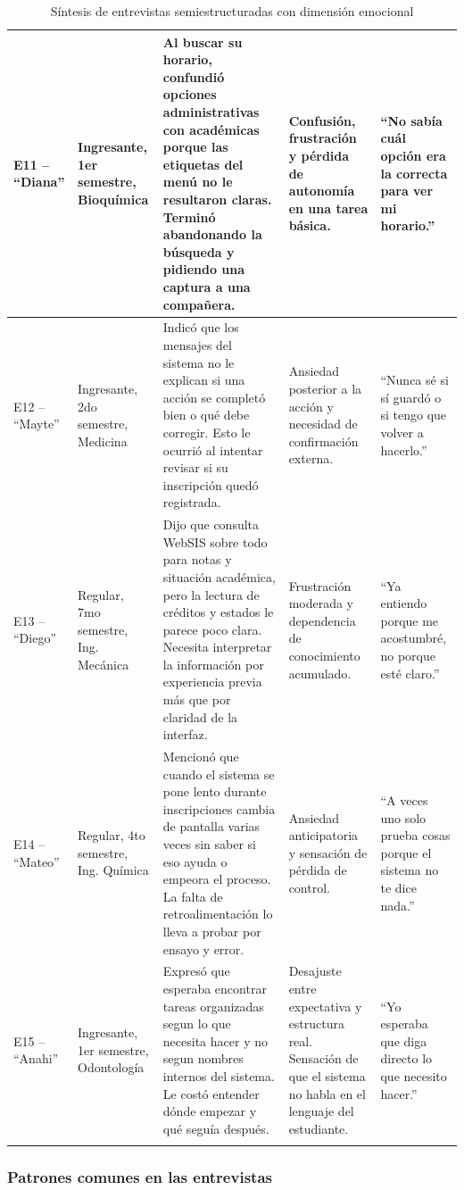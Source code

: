 \begin{longtable}{|p{1.8cm}|p{2.5cm}|p{3.2cm}|p{3.2cm}|p{2.4cm}|}
\hline
E11 -- ``Diana'' & Ingresante, 1er semestre, Bioquímica & Al buscar su horario, confundió opciones administrativas con académicas porque las etiquetas del menú no le resultaron claras. Terminó abandonando la búsqueda y pidiendo una captura a una compañera. & Confusión, frustración y pérdida de autonomía en una tarea básica. & ``No sabía cuál opción era la correcta para ver mi horario.'' \\
\hline
E12 -- ``Mayte'' & Ingresante, 2do semestre, Medicina & Indicó que los mensajes del sistema no le explican si una acción se completó bien o qué debe corregir. Esto le ocurrió al intentar revisar si su inscripción quedó registrada. & Ansiedad posterior a la acción y necesidad de confirmación externa. & ``Nunca sé si sí guardó o si tengo que volver a hacerlo.'' \\
\hline
E13 -- ``Diego'' & Regular, 7mo semestre, Ing. Mecánica & Dijo que consulta WebSIS sobre todo para notas y situación académica, pero la lectura de créditos y estados le parece poco clara. Necesita interpretar la información por experiencia previa más que por claridad de la interfaz. & Frustración moderada y dependencia de conocimiento acumulado. & ``Ya entiendo porque me acostumbré, no porque esté claro.'' \\
\hline
E14 -- ``Mateo'' & Regular, 4to semestre, Ing. Química & Mencionó que cuando el sistema se pone lento durante inscripciones cambia de pantalla varias veces sin saber si eso ayuda o empeora el proceso. La falta de retroalimentación lo lleva a probar por ensayo y error. & Ansiedad anticipatoria y sensación de pérdida de control. & ``A veces uno solo prueba cosas porque el sistema no te dice nada.'' \\
\hline
E15 -- ``Anahi'' & Ingresante, 1er semestre, Odontología & Expresó que esperaba encontrar tareas organizadas segun lo que necesita hacer y no segun nombres internos del sistema. Le costó entender dónde empezar y qué seguía después. & Desajuste entre expectativa y estructura real. Sensación de que el sistema no habla en el lenguaje del estudiante. & ``Yo esperaba que diga directo lo que necesito hacer.'' \\
\hline
\caption{Síntesis de entrevistas semiestructuradas con dimensión emocional}\label{tab:sintesis-entrevistas}
\end{longtable}
\endgroup

\subsubsection{Patrones comunes en las entrevistas}

